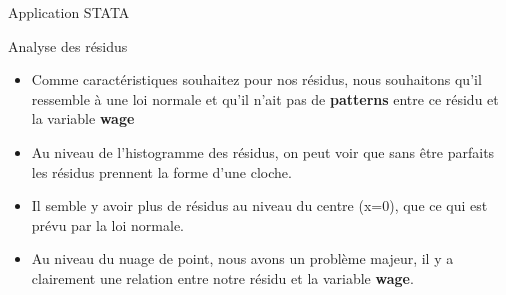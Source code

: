 \documentclass{beamer}
\begin{document}
\begin{frame}{Application STATA}

\begin{block}{Analyse des résidus}
\begin{itemize}
\item Comme caractéristiques souhaitez pour nos résidus, nous souhaitons qu’il ressemble à une loi normale et qu’il n’ait pas de \textbf{patterns} entre ce résidu et la variable \textbf{wage}
\item Au niveau de l’histogramme des résidus, on peut voir que sans être parfaits les résidus prennent la forme d’une cloche. 
\item Il semble y avoir plus de résidus au niveau du centre (x=0), que ce qui est prévu par la loi normale.
\item Au niveau du nuage de point, nous avons un problème majeur, il y a clairement une relation entre notre résidu et la variable \textbf{wage}.
\end{itemize}
\end{block}

\end{frame}
\end{document}

